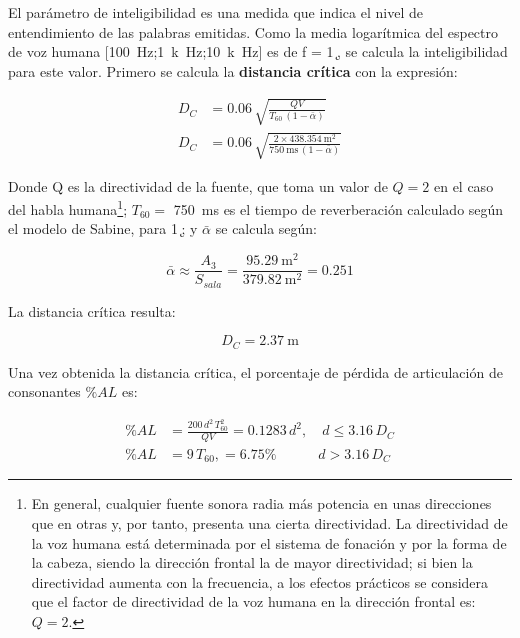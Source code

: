 	El parámetro de inteligibilidad es una medida que indica el nivel de entendimiento de las palabras emitidas. Como la media logarítmica del espectro de voz humana [\SI{100}{\Hz};\SI{1}{k\Hz};\SI{10}{k\Hz}] es de f = \SI{1}{\k\Hz}, se calcula la inteligibilidad para este valor. Primero se calcula la \textbf{distancia crítica} con la expresión:
	
	\begin{align*}
		D_C &= 0.06\,\sqrt{\frac{QV}{T_{60}\,(1 - \bar{\alpha})}}\\
		D_C &= 0.06\,\sqrt{\frac{2\times\SI{438.354}{\square\m}}{\SI{750}{\milli\s}\,(1 - \bar{\alpha})}}
	\end{align*}
		
	Donde Q es la directividad de la fuente, que toma un valor de $Q = 2$ en el caso del habla humana\footnote{En general, cualquier fuente sonora radia más potencia en unas direcciones que en otras y, por tanto, presenta una cierta directividad. La directividad de la voz humana está determinada por el sistema de fonación y por la forma de la cabeza, siendo la dirección frontal la de mayor directividad; si bien la directividad aumenta con la frecuencia, a los efectos prácticos se considera que el factor de directividad de la voz humana en la dirección frontal es: $Q = 2$.}; $T_{60} =$ \SI{750}{\milli\s} es el tiempo de reverberación calculado según el modelo de Sabine, para \SI{1}{\k\Hz}; y $\bar{\alpha}$ se calcula según:

	\begin{equation*}
		\bar{\alpha} \approx \frac{A_3}{S_{sala}} = \frac{\SI{95.29}{\square\m}}{\SI{379.82}{\square\m}} = 0.251
	\end{equation*}
	
	La distancia crítica resulta:
	
	\begin{equation*}
		\boxed{D_C = \SI{2.37}{\m}}
	\end{equation*}
	
	Una vez obtenida la distancia crítica, el porcentaje de pérdida de articulación de consonantes $\% AL$ es:

	\begin{align*}
		\% AL &= \frac{200\,d^2\,T_{60}^2}{QV} = 0.1283\,d^2, \quad d \leq 3.16\,D_C\\
		\% AL &= 9\,T_{60}, = 6.75 \% \quad\quad\quad d > 3.16\, D_C
	\end{align*}
	
